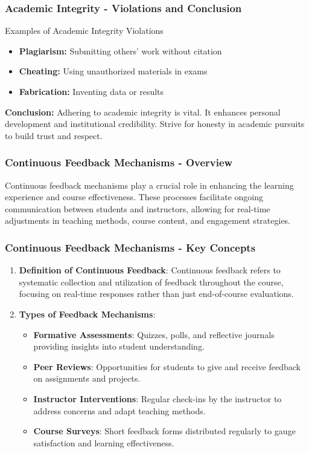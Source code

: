 \documentclass[aspectratio=169]{beamer}
\begin{document}
\begin{frame}[fragile]
    \frametitle{Academic Integrity - Violations and Conclusion}
    \begin{block}{Examples of Academic Integrity Violations}
        \begin{itemize}
            \item \textbf{Plagiarism:} Submitting others' work without citation
            \item \textbf{Cheating:} Using unauthorized materials in exams
            \item \textbf{Fabrication:} Inventing data or results
        \end{itemize}
    \end{block}

    \textbf{Conclusion:} 
    Adhering to academic integrity is vital. It enhances personal development and institutional credibility. Strive for honesty in academic pursuits to build trust and respect.
\end{frame}

\begin{frame}[fragile]
    \frametitle{Continuous Feedback Mechanisms - Overview}
    Continuous feedback mechanisms play a crucial role in enhancing the learning experience and course effectiveness. 
    These processes facilitate ongoing communication between students and instructors, allowing for real-time adjustments in teaching methods, course content, and engagement strategies.
\end{frame}

\begin{frame}[fragile]
    \frametitle{Continuous Feedback Mechanisms - Key Concepts}
    \begin{enumerate}
        \item \textbf{Definition of Continuous Feedback}: 
            Continuous feedback refers to systematic collection and utilization of feedback throughout the course, focusing on real-time responses rather than just end-of-course evaluations.
        
        \item \textbf{Types of Feedback Mechanisms}:
            \begin{itemize}
                \item \textbf{Formative Assessments}: Quizzes, polls, and reflective journals providing insights into student understanding.
                \item \textbf{Peer Reviews}: Opportunities for students to give and receive feedback on assignments and projects.
                \item \textbf{Instructor Interventions}: Regular check-ins by the instructor to address concerns and adapt teaching methods.
                \item \textbf{Course Surveys}: Short feedback forms distributed regularly to gauge satisfaction and learning effectiveness.
            \end{itemize}
    \end{enumerate}
\end{frame}
\end{document}
